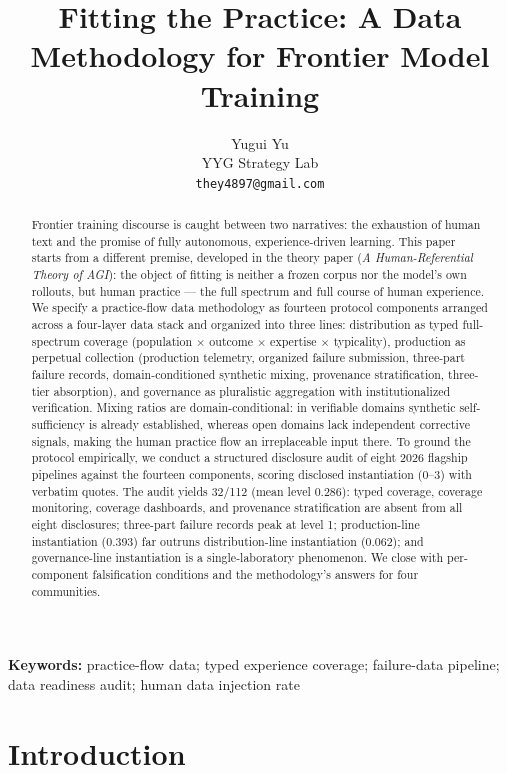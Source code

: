 \documentclass[10pt]{article}
\title{Fitting the Practice: A Data Methodology for Frontier Model Training}
\author{Yugui Yu\\ YYG Strategy Lab\\ \texttt{they4897@gmail.com}}
\date{}
\begin{document}
\maketitle

\begin{abstract}
\noindent Frontier training discourse is caught between two narratives: the exhaustion of human text and the promise of fully autonomous, experience-driven learning. This paper starts from a different premise, developed in the theory paper (\emph{A Human-Referential Theory of AGI}): the object of fitting is neither a frozen corpus nor the model's own rollouts, but human practice --- the full spectrum and full course of human experience. We specify a practice-flow data methodology as fourteen protocol components arranged across a four-layer data stack and organized into three lines: distribution as typed full-spectrum coverage (population $\times$ outcome $\times$ expertise $\times$ typicality), production as perpetual collection (production telemetry, organized failure submission, three-part failure records, domain-conditioned synthetic mixing, provenance stratification, three-tier absorption), and governance as pluralistic aggregation with institutionalized verification. Mixing ratios are domain-conditional: in verifiable domains synthetic self-sufficiency is already established, whereas open domains lack independent corrective signals, making the human practice flow an irreplaceable input there. To ground the protocol empirically, we conduct a structured disclosure audit of eight 2026 flagship pipelines against the fourteen components, scoring disclosed instantiation (0--3) with verbatim quotes. The audit yields 32/112 (mean level 0.286): typed coverage, coverage monitoring, coverage dashboards, and provenance stratification are absent from all eight disclosures; three-part failure records peak at level 1; production-line instantiation (0.393) far outruns distribution-line instantiation (0.062); and governance-line instantiation is a single-laboratory phenomenon. We close with per-component falsification conditions and the methodology's answers for four communities.
\end{abstract}

\medskip
\noindent\textbf{Keywords:} practice-flow data; typed experience coverage; failure-data pipeline; data readiness audit; human data injection rate

\section{Introduction}
\end{document}
